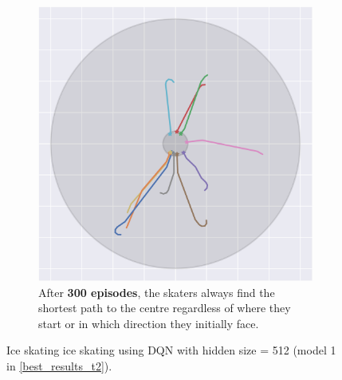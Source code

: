 \begin{figure}[H]
\begin{subfigure}[t]{.48\textwidth}
		\includegraphics[width=\textwidth]{circle_images/image_300.png}
		\caption{After \textbf{300 episodes}, the skaters always find the shortest path to the centre regardless of where they start or in which direction they initially face.}
	\end{subfigure}
	\caption{Ice skating ice skating using DQN with hidden size = 512 (model \colorbox{id1}{1} in \cref{best_results_t2}).}
	\label{circle_plots}
\end{figure}
